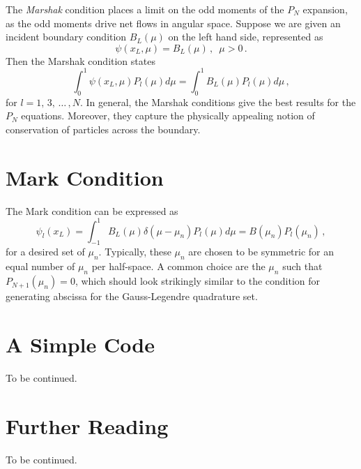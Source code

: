 The \textit{Marshak} condition places a limit on the odd moments of the $P_N$ expansion, as the odd moments drive net flows in angular space.   Suppose we are given an incident boundary condition $B_L(\mu)$ on the left hand side, represented as
\begin{equation}
 \psi(x_L,\mu) = B_L(\mu) \, , \,\,\, \mu > 0 \, .
\end{equation}
Then the Marshak condition states
\begin{equation}
 \int^1_0 \psi(x_L,\mu)P_l(\mu)d\mu = \int^1_0 B_L(\mu) P_l(\mu)d\mu  \, ,
\end{equation}
for $l = 1,\, 3,\, \ldots \, ,N$.  In general, the Marshak conditions give the best results for the $P_N$ equations.  Moreover, they capture the physically appealing notion of conservation of particles across the boundary.

\section*{Mark Condition}

The Mark condition can be expressed as
\begin{equation}
 \psi_l(x_L) = \int^1_{-1} B_L(\mu) \delta(\mu-\mu_n)P_l(\mu) d\mu = B(\mu_n) P_l(\mu_n) \, ,
\end{equation}
for a desired set of $\mu_n$.  Typically, these $\mu_n$ are chosen to be symmetric for an equal number of $\mu_n$ per half-space.   A common choice are the $\mu_n$ such that $P_{N+1}(\mu_n) = 0$, which should look strikingly similar to the condition for generating abscissa for the Gauss-Legendre quadrature set.

\section*{A Simple Code}
To be continued.

\section*{Further Reading}
To be continued.

